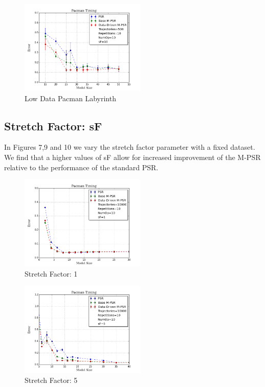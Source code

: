 \begin{figure}[ht!]
\centering
\includegraphics[width=60mm]{uCOREPICS/Pacman/Pacman500.png}
\caption{Low Data Pacman Labyrinth\label{overflow}}
\end{figure}

\subsection{Stretch Factor: sF}

In Figures 7,9 and 10 we vary the stretch factor parameter with a fixed dataset. We find that a higher values of sF allow for increased improvement of the M-PSR relative to the performance of the standard PSR.

\begin{figure}[ht!]
\centering
\includegraphics[width=60mm]{uCOREPICS/Pacman/PacmanSF=1.png}
\caption{Stretch Factor: 1\label{overflow}}
\end{figure}

\begin{figure}[ht!]
\centering
\includegraphics[width=60mm]{uCOREPICS/Pacman/PacmanSF=5.png}
\caption{Stretch Factor: 5\label{overflow}}
\end{figure}


